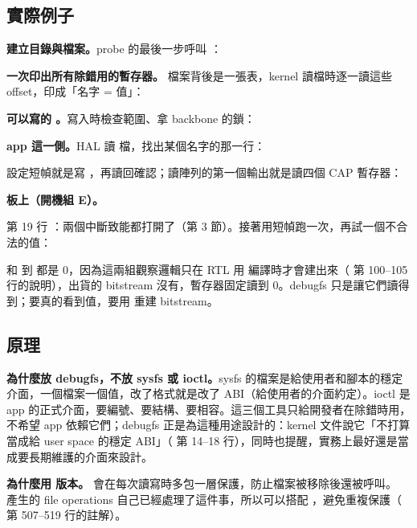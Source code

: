 \subsection{實際例子}

\textbf{建立目錄與檔案。}probe 的最後一步呼叫 ：


\textbf{一次印出所有除錯用的暫存器。} 檔案背後是一張表，kernel 讀檔時逐一讀這些 offset，印成「名字 = 值」：


\textbf{可以寫的 。}寫入時檢查範圍、拿 backbone 的鎖：


\textbf{app 這一側。}HAL 讀  檔，找出某個名字的那一行：


設定短幀就是寫 ，再讀回確認；讀陣列的第一個輸出就是讀四個 CAP 暫存器：


\textbf{板上（開機組 E）。}


第 19 行 ：兩個中斷致能都打開了（第 3 節）。接著用短幀跑一次，再試一個不合法的值：


 和  到  都是 0，因為這兩組觀察邏輯只在 RTL 用  編譯時才會建出來（ 第 100--105 行的說明），出貨的 bitstream 沒有，暫存器固定讀到 0。debugfs 只是讓它們讀得到；要真的看到值，要用  重建 bitstream。

\subsection{原理}

\textbf{為什麼放 debugfs，不放 sysfs 或 ioctl。}sysfs 的檔案是給使用者和腳本的穩定介面，一個檔案一個值，改了格式就是改了 ABI（給使用者的介面約定）。ioctl 是 app 的正式介面，要編號、要結構、要相容。這三個工具只給開發者在除錯時用，不希望 app 依賴它們；debugfs 正是為這種用途設計的：kernel 文件說它「不打算當成給 user space 的穩定 ABI」（ 第 14--18 行），同時也提醒，實務上最好還是當成要長期維護的介面來設計。

\textbf{為什麼用  版本。} 會在每次讀寫時多包一層保護，防止檔案被移除後還被呼叫。 產生的 file operations 自己已經處理了這件事，所以可以搭配 ，避免重複保護（ 第 507--519 行的註解）。

